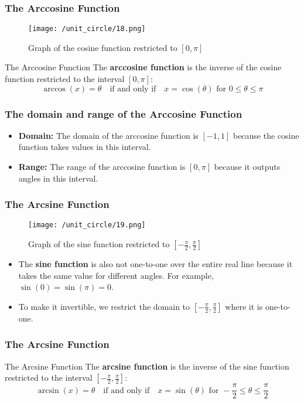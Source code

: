 \begin{frame}
    \frametitle{The Arccosine Function}
    \begin{figure}
        \centering
        \texttt{[image: /unit\_circle/18.png]}
        \caption{Graph of the cosine function restricted to \([0, \pi]\)}
    \end{figure}
    \begin{block}{The Arccosine Function}
        The \textbf{arccosine function} is the inverse of the cosine function restricted to the interval \([0, \pi]\):
        \[
        \arccos(x) = \theta \quad \text{if and only if} \quad x = \cos(\theta) \text{ for } 0 \leq \theta \leq \pi
        \]
    \end{block}
\end{frame}

\begin{frame}
\frametitle{The domain and range of the Arccosine Function}
\begin{itemize}
    \item \textbf{Domain:} The domain of the arccosine function is \([-1, 1]\) because the cosine function takes values in this interval.
    \item \textbf{Range:} The range of the arccosine function is \([0, \pi]\) because it outputs angles in this interval.
\end{itemize}       
\end{frame}

\begin{frame}
    \frametitle{The Arcsine Function}
    \begin{figure}
        \centering
        \texttt{[image: /unit\_circle/19.png]}
        \caption{Graph of the sine function restricted to \([- \frac{\pi}{2}, \frac{\pi}{2}]\)}
    \end{figure}
    \begin{itemize}
        \item The \textbf{sine function} is also not one-to-one over the entire real line because it takes the same value for different angles. For example, \(\sin(0) = \sin(\pi) = 0\).
        \item To make it invertible, we restrict the domain to \([- \frac{\pi}{2}, \frac{\pi}{2}]\) where it is one-to-one.
    \end{itemize}
\end{frame}

\begin{frame}
    \frametitle{The Arcsine Function}
    \begin{block}{The Arcsine Function}
        The \textbf{arcsine function} is the inverse of the sine function restricted to the interval \([- \frac{\pi}{2}, \frac{\pi}{2}]\):
        \[
        \arcsin(x) = \theta \quad \text{if and only if} \quad x = \sin(\theta) \text{ for } -\frac{\pi}{2} \leq \theta \leq \frac{\pi}{2}
        \]
    \end{block}
\end{frame}

